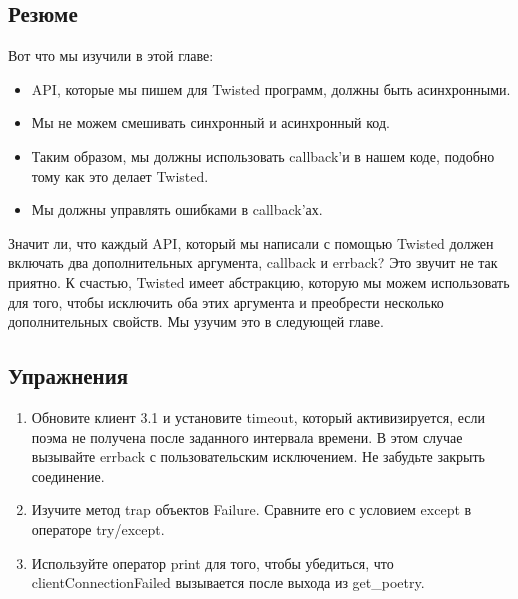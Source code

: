 \subsection{Резюме}

Вот что мы изучили в этой главе:

\begin{itemize}
\item API, которые мы пишем для Twisted программ, должны быть асинхронными.
\item Мы не можем смешивать синхронный и асинхронный код.
\item Таким образом, мы должны использовать callback'и в нашем коде, подобно 
тому как это делает Twisted.
\item Мы должны управлять ошибками в callback'ах.
\end{itemize}


Значит ли, что каждый API, который мы написали с помощью 
Twisted должен включать два дополнительных аргумента, 
callback и errback? Это звучит не так приятно. 
К счастью, Twisted имеет абстракцию, которую мы можем 
использовать для того, чтобы исключить оба этих аргумента 
и преобрести несколько дополнительных свойств. 
Мы узучим это в следующей главе.

\subsection{Упражнения}

\begin{enumerate}
\item Обновите клиент 3.1 и установите timeout, который 
активизируется, если поэма не получена после заданного 
интервала времени. В этом случае вызывайте errback с пользовательским исключением. 
Не забудьте закрыть соединение. 
\item Изучите метод trap объектов Failure. Сравните его с условием except в операторе try/except.
\item Используйте оператор print для того, чтобы убедиться, что clientConnectionFailed 
вызывается после выхода из get\_poetry.
\end{enumerate}

